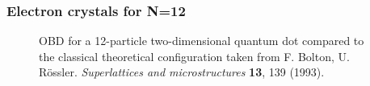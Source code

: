 \begin{frame}
\frametitle{Electron crystals for N=12}
 \begin{figure}
 \begin{center}
  \label{fig:wigner20}
  \caption{OBD for a 12-particle two-dimensional quantum dot compared to the classical theoretical configuration taken from F. Bolton, U. Rössler.  \textit{Superlattices and microstructures} \textbf{13}, 139 (1993).}
 \end{center}
\end{figure}
\end{frame}

